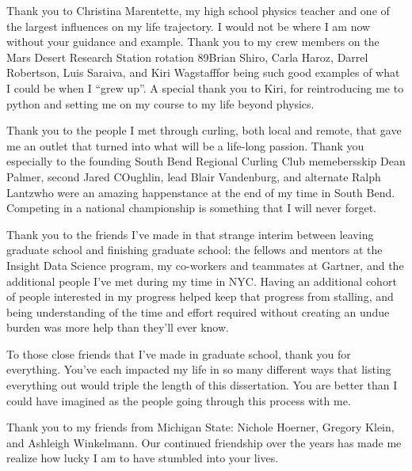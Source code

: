 \begin{acknowledge}
Thank you to Christina Marentette, my high school physics teacher and
one of the largest influences on my life trajectory. I would not be
where I am now without your guidance and example. Thank you to my crew
members on the Mars Desert Research Station rotation
89\textemdash{}Brian Shiro, Carla Haroz, Darrel Robertson, Luis Saraiva,
and Kiri Wagstaff\textemdash{}for being such good examples of what I
could be when I ``grew up''. A special thank you to Kiri, for
reintroducing me to python and setting me on my course to my life beyond
physics.

Thank you to the people I met through curling, both local and remote,
that gave me an outlet that turned into what will be a life-long
passion. Thank you especially to the founding South Bend Regional
Curling Club memebers\textemdash{}skip Dean Palmer, second Jared
COughlin, lead Blair Vandenburg, and alternate Ralph
Lantz\textemdash{}who were an amazing happenstance at the end of my time
in South Bend. Competing in a national championship is something that I
will never forget.

Thank you to the friends I've made in that strange interim between
leaving graduate school and finishing graduate school: the fellows and
mentors at the Insight Data Science program, my co-workers and teammates
at Gartner, and the additional people I've met during my time in NYC.
Having an additional cohort of people interested in my progress helped
keep that progress from stalling, and being understanding of the time
and effort required without creating an undue burden was more help than
they'll ever know.

To those close friends that I've made in graduate school, thank you for
everything. You've each impacted my life in so many different ways that
listing everything out would triple the length of this dissertation. You
are better than I could have imagined as the people going through this
process with me.

Thank you to my friends from Michigan State: Nichole Hoerner, Gregory
Klein, and Ashleigh Winkelmann. Our continued friendship over the years
has made me realize how lucky I am to have stumbled into your lives.


\end{acknowledge}
